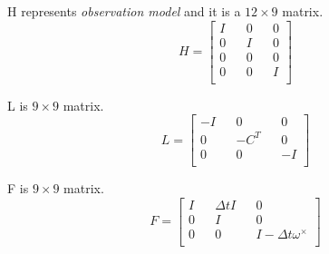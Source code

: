 \documentclass[letterpaper, 10 pt, conference]{ieeeconf}  %
\newcommand{\transpose}[1]{\ensuremath{#1^{\scriptscriptstyle T}}}
\begin{document}
H represents \textit{observation model} and it is a \(12 \times 9\) matrix.
\begin{equation}
H =
\begin{bmatrix}
        I && 0 && 0  \\
        0 && I && 0  \\
        0 && 0 && 0  \\
        0 && 0 && I  \\
\end{bmatrix}
\end{equation}

L is \(9 \times 9\) matrix.
\begin{equation}
L =
\begin{bmatrix}
        -I && 0 && 0  \\
        0 && -\transpose{C} && 0  \\
        0 && 0 && -I  \\
\end{bmatrix}
\end{equation}


F is \(9 \times 9\) matrix.
\begin{equation}
F =
\begin{bmatrix}
        I && \Delta t   I && 0  \\
        0 && I && 0  \\
        0 && 0 && I- \Delta t \omega^{\times}  \\
\end{bmatrix}
\end{equation}








\end{document}
